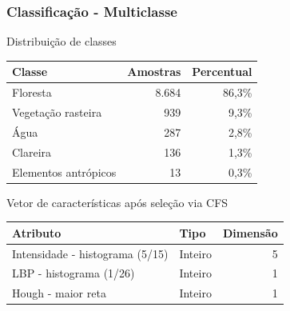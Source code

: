 \documentclass[t]{beamer}
\begin{document}
\begin{frame}[c]
	\frametitle{Classificação - Multiclasse}

	\centering
	Distribuição de classes

	\small{
	\begin{table}[h]
	\centering
	\begin{tabulary}{\linewidth}{|L|R|R|}
		\hline
		\textbf{Classe} & \textbf{Amostras} & \textbf{Percentual} \\ \hline
		Floresta             & 8.684 & 86,3\% \\ \hline
		Vegetação rasteira   & 939   &  9,3\% \\ \hline
		Água                 & 287   &  2,8\% \\ \hline
		Clareira             & 136   &  1,3\% \\ \hline
		Elementos antrópicos & 13    &  0,3\% \\ \hline
	\end{tabulary}
	\end{table}
	}

	\centering
	Vetor de características após seleção via CFS

	\small{
	\begin{table}[h]
	\centering
	\begin{tabulary}{\linewidth}{|L|L|R|}
	\hline
	\textbf{Atributo} & \textbf{Tipo} & \textbf{Dimensão} \\ \hline
	Intensidade - histograma (5/15) & Inteiro & 5 \\ \hline
	LBP - histograma (1/26)         & Inteiro & 1 \\ \hline
	Hough - maior reta              & Inteiro & 1 \\ \hline
	\end{tabulary}
	\end{table}
	}
\end{frame}
\end{document}
